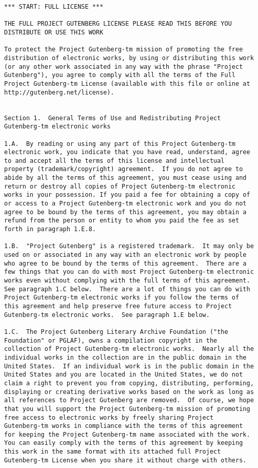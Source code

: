 \documentclass[letterpaper,12pt,oneside,openany]{memoir}
\begin{document}
\begin{verbatim}
*** START: FULL LICENSE ***

THE FULL PROJECT GUTENBERG LICENSE PLEASE READ THIS BEFORE YOU
DISTRIBUTE OR USE THIS WORK

To protect the Project Gutenberg-tm mission of promoting the free
distribution of electronic works, by using or distributing this work
(or any other work associated in any way with the phrase "Project
Gutenberg"), you agree to comply with all the terms of the Full
Project Gutenberg-tm License (available with this file or online at
http://gutenberg.net/license).


Section 1.  General Terms of Use and Redistributing Project
Gutenberg-tm electronic works

1.A.  By reading or using any part of this Project Gutenberg-tm
electronic work, you indicate that you have read, understand, agree
to and accept all the terms of this license and intellectual
property (trademark/copyright) agreement.  If you do not agree to
abide by all the terms of this agreement, you must cease using and
return or destroy all copies of Project Gutenberg-tm electronic
works in your possession. If you paid a fee for obtaining a copy of
or access to a Project Gutenberg-tm electronic work and you do not
agree to be bound by the terms of this agreement, you may obtain a
refund from the person or entity to whom you paid the fee as set
forth in paragraph 1.E.8.

1.B.  "Project Gutenberg" is a registered trademark.  It may only be
used on or associated in any way with an electronic work by people
who agree to be bound by the terms of this agreement.  There are a
few things that you can do with most Project Gutenberg-tm electronic
works even without complying with the full terms of this agreement.
See paragraph 1.C below.  There are a lot of things you can do with
Project Gutenberg-tm electronic works if you follow the terms of
this agreement and help preserve free future access to Project
Gutenberg-tm electronic works.  See paragraph 1.E below.

1.C.  The Project Gutenberg Literary Archive Foundation ("the
Foundation" or PGLAF), owns a compilation copyright in the
collection of Project Gutenberg-tm electronic works.  Nearly all the
individual works in the collection are in the public domain in the
United States.  If an individual work is in the public domain in the
United States and you are located in the United States, we do not
claim a right to prevent you from copying, distributing, performing,
displaying or creating derivative works based on the work as long as
all references to Project Gutenberg are removed.  Of course, we hope
that you will support the Project Gutenberg-tm mission of promoting
free access to electronic works by freely sharing Project
Gutenberg-tm works in compliance with the terms of this agreement
for keeping the Project Gutenberg-tm name associated with the work.
You can easily comply with the terms of this agreement by keeping
this work in the same format with its attached full Project
Gutenberg-tm License when you share it without charge with others.


\end{verbatim}
\end{document}
